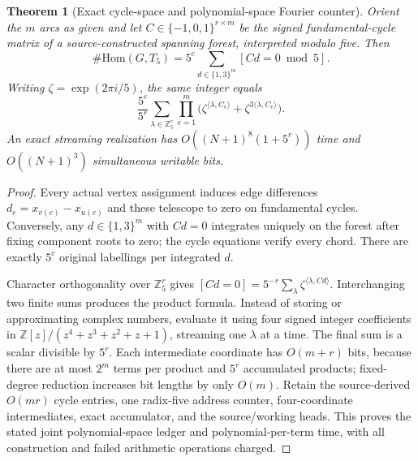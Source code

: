 \documentclass[11pt]{article}
\newtheorem{theorem}{Theorem}
\begin{document}
\begin{theorem}[Exact cycle-space and polynomial-space Fourier counter]
Orient the $m$ arcs as given and let
$C\in\{-1,0,1\}^{r\times m}$ be the signed fundamental-cycle
matrix of a source-constructed spanning forest, interpreted modulo
five. Then
\[
 \#\mathrm{Hom}(G,T_5)
 =5^c\sum_{d\in\{1,3\}^m}[Cd=0\bmod 5].
\]
Writing $\zeta=\exp(2\pi i/5)$, the same integer equals
\[
 \frac{5^c}{5^r}\!
 \sum_{\lambda\in\mathbb Z_5^r}
 \prod_{e=1}^m
 \bigl(\zeta^{\langle\lambda,C_e\rangle}
       +\zeta^{3\langle\lambda,C_e\rangle}\bigr).
\]
An exact streaming realization has
$O((N+1)^8(1+5^r))$ time and
$O((N+1)^3)$ simultaneous writable bits.
\end{theorem}
\begin{proof}
Every actual vertex assignment induces edge differences
$d_e=x_{v(e)}-x_{u(e)}$ and these telescope to zero on
fundamental cycles. Conversely, any $d\in\{1,3\}^m$ with
$Cd=0$ integrates uniquely on the forest after fixing component
roots to zero; the cycle equations verify every chord.
There are exactly $5^c$ original labellings per integrated $d$.

Character orthogonality over $\mathbb Z_5^r$ gives
$[Cd=0]=5^{-r}\sum_\lambda\zeta^{\langle\lambda,Cd\rangle}$.
Interchanging two finite sums produces the product formula.
Instead of storing or approximating complex numbers, evaluate it
using four signed integer coefficients in
$\mathbb Z[z]/(z^4+z^3+z^2+z+1)$, streaming one
$\lambda$ at a time. The final sum is a scalar divisible by $5^r$.
Each intermediate coordinate has $O(m+r)$ bits, because there are
at most $2^m$ terms per product and $5^r$ accumulated products;
fixed-degree reduction increases bit lengths by only $O(m)$.
Retain the source-derived $O(mr)$ cycle entries, one radix-five
address counter, four-coordinate intermediates, exact accumulator,
and the source/working heads. This proves the stated joint
polynomial-space ledger and polynomial-per-term time, with all
construction and failed arithmetic operations charged.
\end{proof}
\end{document}

